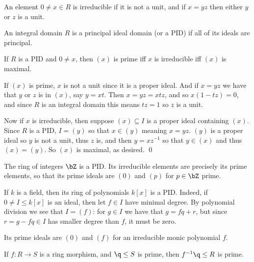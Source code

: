 \eproof

\bdefn

    \benum
        \item An element $0\neq x\in R$ is {\emphcolor irreducible} if it is not a unit, and if $x=yz$ then either $y$ or $z$ is a unit.
        \item An integral domain $R$ is a {\emphcolor principal ideal domain} (or a {\emphcolor PID}) if all of its ideals are principal.
    \eenum

\edefn

\bprop

    If $R$ is a PID and $0\neq x$, then $(x)$ is prime iff $x$ is irreducible iff $(x)$ is maximal.

\eprop

\bproof

    If $(x)$ is prime, $x$ is not a unit since it is a proper ideal.
    And if $x=yz$ we have that $y$ or $z$ is in $(x)$, say $y=xt$.
    Then $x=yz=xtz$, and so $x(1-tz)=0$, and since $R$ is an integral domain this means $tz=1$ so $z$ is a unit.

    Now if $x$ is irreducible, then suppose $(x)\subseteq I$ is a proper ideal containing $(x)$.
    Since $R$ is a PID, $I=(y)$ so that $x\in(y)$ meaning $x=yz$.
    $(y)$ is a proper ideal so $y$ is not a unit, thus $z$ is, and then $y=xz^{-1}$ so that $y\in(x)$ and thus $(x)=(y)$.
    So $(x)$ is maximal, as desired.
    \qed

\eproof

\bexam

    The ring of integers $\bZ$ is a PID.
    Its irreducible elements are precisely its prime elements, so that its prime ideals are $(0)$ and $(p)$ for $p\in\bZ$ prime.

\eexam

\bexam

    If $k$ is a field, then its ring of polynomials $k[x]$ is a PID.
    Indeed, if $0\neq I\leq k[x]$ is an ideal, then let $f\in I$ have minimal degree.
    By polynomial division we see that $I=(f)$: for $g\in I$ we have that $g=fq+r$, but since $r=g-fq\in I$ has smaller degree than $f$,
    it must be zero.

    Its prime ideals are $(0)$ and $(f)$ for an irreducible monic polynomial $f$.

\eexam

\blemm

    If $f\colon R\to S$ is a ring morphism, and $\q\leq S$ is prime, then $f^{-1}\q\leq R$ is prime.

